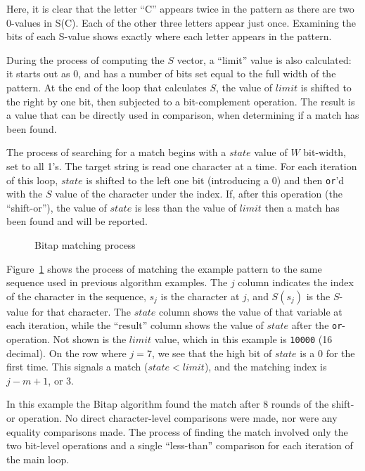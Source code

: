 Here, it is clear that the letter ``C'' appears twice in the pattern as there are two 0-values in S(C). Each of the other three letters appear just once. Examining the bits of each S-value shows exactly where each letter appears in the pattern.

During the process of computing the $S$ vector, a ``limit'' value is also calculated: it starts out as 0, and has a number of bits set equal to the full width of the pattern. At the end of the loop that calculates $S$, the value of $limit$ is shifted to the right by one bit, then subjected to a bit-complement operation. The result is a value that can be directly used in comparison, when determining if a match has been found.

The process of searching for a match begins with a $state$ value of $W$ bit-width, set to all 1's. The target string is read one character at a time. For each iteration of this loop, $state$ is shifted to the left one bit (introducing a 0) and then \texttt{or}'d with the $S$ value of the character under the index. If, after this operation (the ``shift-or''), the value of $state$ is less than the value of $limit$ then a match has been found and will be reported.

\begin{figure}[ht]
\centering

\caption{Bitap matching process}
\label{fig:bitap_matching}
\end{figure}

Figure~\ref{fig:bitap_matching} shows the process of matching the example pattern to the same sequence used in previous algorithm examples. The $j$ column indicates the index of the character in the sequence, $s_j$ is the character at $j$, and $S(s_j)$ is the $S$-value for that character. The $state$ column shows the value of that variable at each iteration, while the ``result'' column shows the value of $state$ after the \texttt{or}-operation. Not shown is the $limit$ value, which in this example is \texttt{10000} (16 decimal). On the row where $j = 7$, we see that the high bit of $state$ is a 0 for the first time. This signals a match ($state < limit$), and the matching index is $j - m + 1$, or 3.

In this example the Bitap algorithm found the match after 8 rounds of the shift-or operation. No direct character-level comparisons were made, nor were any equality comparisons made. The process of finding the match involved only the two bit-level operations and a single ``less-than'' comparison for each iteration of the main loop.


